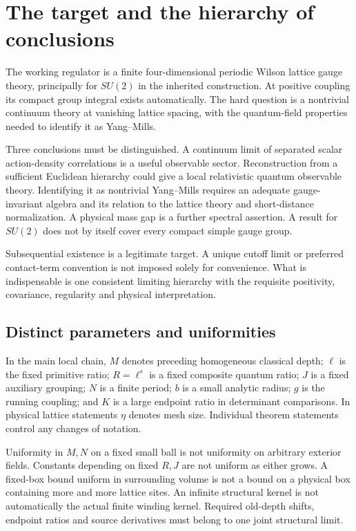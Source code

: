 \documentclass[11pt]{article}
\theoremstyle{remark}
\begin{document}
\section{The target and the hierarchy of conclusions}
\label{hdc-target}

The working regulator is a finite four-dimensional periodic
Wilson lattice gauge theory, principally for \(SU(2)\) in the
inherited construction. At positive coupling its compact group
integral exists automatically. The hard question is a nontrivial
continuum theory at vanishing lattice spacing, with the
quantum-field properties needed to identify it as Yang--Mills.

Three conclusions must be distinguished. A continuum limit of
separated scalar action-density correlations is a useful
observable sector. Reconstruction from a sufficient Euclidean
hierarchy could give a local relativistic quantum observable
theory. Identifying it as nontrivial Yang--Mills requires an
adequate gauge-invariant algebra and its relation to the lattice
theory and short-distance normalization. A physical mass gap is
a further spectral assertion. A result for \(SU(2)\) does not
by itself cover every compact simple gauge group.

Subsequential existence is a legitimate target. A unique cutoff
limit or preferred contact-term convention is not imposed
solely for convenience. What is indispensable is one consistent
limiting hierarchy with the requisite positivity, covariance,
regularity and physical interpretation.

\subsection{Distinct parameters and uniformities}

In the main local chain, \(M\) denotes preceding homogeneous
classical depth; \(\ell\) is the fixed primitive ratio;
\(R=\ell^s\) is a fixed composite quantum ratio; \(J\) is a
fixed auxiliary grouping; \(N\) is a finite period; \(b\) is
a small analytic radius; \(g\) is the running coupling; and
\(K\) is a large endpoint ratio in determinant comparisons.
In physical lattice statements \(\eta\) denotes mesh size.
Individual theorem statements control any changes of notation.

Uniformity in \(M,N\) on a fixed small ball is not uniformity on
arbitrary exterior fields. Constants depending on fixed \(R,J\)
are not uniform as either grows. A fixed-box bound uniform in
surrounding volume is not a bound on a physical box containing
more and more lattice sites. An infinite structural kernel is
not automatically the actual finite winding kernel. Required
old-depth shifts, endpoint ratios and source derivatives must
belong to one joint structural limit.
\end{document}

